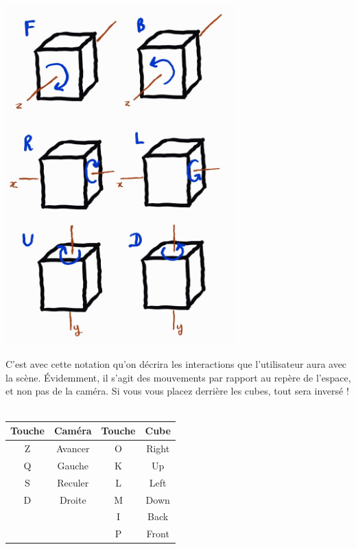 \begin{center}
\includegraphics[width=250pt]{Rubik2.jpg}
\end{center}
C'est avec cette notation qu'on décrira les interactions que l'utilisateur aura avec la scène. Évidemment, il s'agit des mouvements par rapport au repère de l'espace, et non pas de la caméra. Si vous vous placez derrière les cubes, tout sera inversé !
\\\\
\begin{tabular}{| c | c || c | c |}
	\hline
	Touche & Caméra & Touche & Cube\\
	\hline \hline
	Z & Avancer & O & Right \\ \hline
	Q & Gauche & K & Up\\ \hline
	S & Reculer & L & Left\\ \hline
	D & Droite & M & Down\\ \hline
	&& I & Back\\ \hline
	&& P & Front\\ \hline
\end{tabular}
